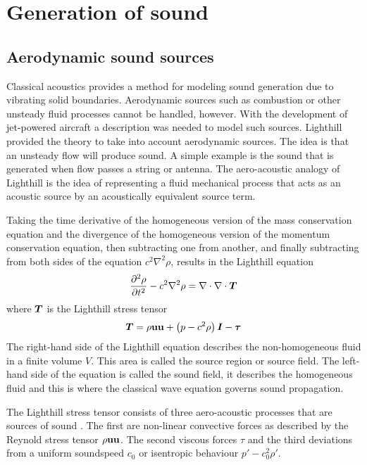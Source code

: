 \section{Generation of sound}

\subsection{Aerodynamic sound sources}\label{sec:theory:sound:aerodynamic}
Classical acoustics provides a method for modeling sound generation due to
vibrating solid boundaries. Aerodynamic sources such as combustion or other
unsteady fluid processes cannot be handled, however. With the development of
jet-powered aircraft a description was needed to model such sources. Lighthill
provided the theory to take into account aerodynamic sources. The idea is that
an unsteady flow will produce sound. A simple example is the sound that is
generated when flow passes a string or antenna.
The aero-acoustic analogy of Lighthill is the idea of representing a fluid
mechanical process that acts as an acoustic source by an acoustically equivalent
source term.


Taking the time derivative of the homogeneous version of the mass conservation
equation and the divergence of the homogeneous version of the momentum
conservation equation, then subtracting one from another, and finally
subtracting from both sides of the equation $c^2 \nabla^2 \rho$, results in the
Lighthill equation
\begin{equation}
  \frac{\partial^2 \rho}{\partial t^2} - c^2 \nabla^2 \rho = \nabla \cdot \nabla \cdot \bm{T}
\end{equation}
where $\bm{T}$ is the Lighthill stress tensor
\begin{equation}
  \bm{T} = \rho \mathbf{u}\mathbf{u} + \left( p - c^2 \rho \right) \bm{I} - \bm{\tau}
\end{equation}
The right-hand side of the Lighthill equation describes the non-homogeneous
fluid in a finite volume $V$. This area is called the source region or source
field. The left-hand side of the equation is called the sound field, it
describes the homogeneous fluid and this is where the classical wave equation
governs sound propagation.

The Lighthill stress tensor consists of three aero-acoustic processes that are
sources of sound \cite{Rienstra2017}. The first are non-linear convective forces
as described by the Reynold stress tensor $\rho \mathbf{u}\mathbf{u}$. The second
viscous forces $\tau$ and the third deviations from a uniform soundspeed
$c_0$ or isentropic behaviour $p' - c_0^2 \rho'$. 

